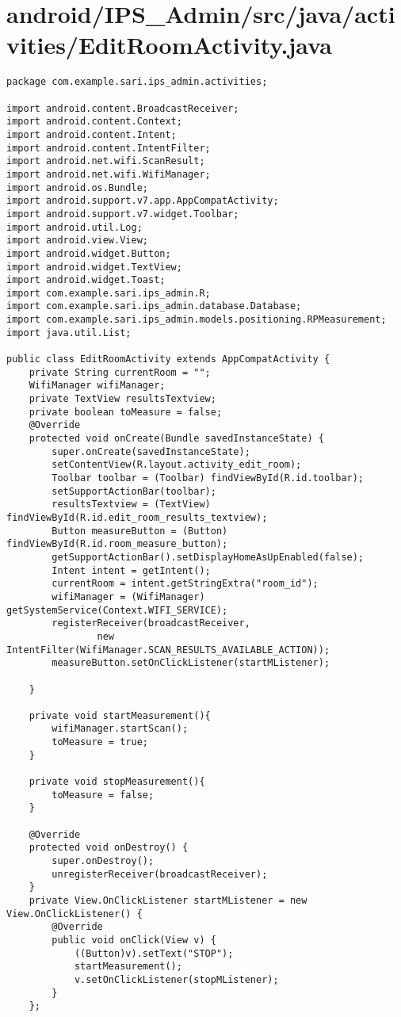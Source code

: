 \section{android/IPS\_Admin/src/java/activities/EditRoomActivity.java}
\begin{lstlisting}package com.example.sari.ips_admin.activities;

import android.content.BroadcastReceiver;
import android.content.Context;
import android.content.Intent;
import android.content.IntentFilter;
import android.net.wifi.ScanResult;
import android.net.wifi.WifiManager;
import android.os.Bundle;
import android.support.v7.app.AppCompatActivity;
import android.support.v7.widget.Toolbar;
import android.util.Log;
import android.view.View;
import android.widget.Button;
import android.widget.TextView;
import android.widget.Toast;
import com.example.sari.ips_admin.R;
import com.example.sari.ips_admin.database.Database;
import com.example.sari.ips_admin.models.positioning.RPMeasurement;
import java.util.List;

public class EditRoomActivity extends AppCompatActivity {
    private String currentRoom = "";
    WifiManager wifiManager;
    private TextView resultsTextview;
    private boolean toMeasure = false;
    @Override
    protected void onCreate(Bundle savedInstanceState) {
        super.onCreate(savedInstanceState);
        setContentView(R.layout.activity_edit_room);
        Toolbar toolbar = (Toolbar) findViewById(R.id.toolbar);
        setSupportActionBar(toolbar);
        resultsTextview = (TextView) findViewById(R.id.edit_room_results_textview);
        Button measureButton = (Button) findViewById(R.id.room_measure_button);
        getSupportActionBar().setDisplayHomeAsUpEnabled(false);
        Intent intent = getIntent();
        currentRoom = intent.getStringExtra("room_id");
        wifiManager = (WifiManager) getSystemService(Context.WIFI_SERVICE);
        registerReceiver(broadcastReceiver,
                new IntentFilter(WifiManager.SCAN_RESULTS_AVAILABLE_ACTION));
        measureButton.setOnClickListener(startMListener);

    }

    private void startMeasurement(){
        wifiManager.startScan();
        toMeasure = true;
    }

    private void stopMeasurement(){
        toMeasure = false;
    }

    @Override
    protected void onDestroy() {
        super.onDestroy();
        unregisterReceiver(broadcastReceiver);
    }
    private View.OnClickListener startMListener = new View.OnClickListener() {
        @Override
        public void onClick(View v) {
            ((Button)v).setText("STOP");
            startMeasurement();
            v.setOnClickListener(stopMListener);
        }
    };


\end{lstlisting}
